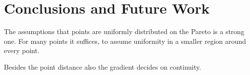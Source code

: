 \documentclass{stdlocal}
\begin{document}
\section{Conclusions and Future Work} %
\label{sec:conclusions}
  The assumptions that points are uniformly distributed on the Pareto is a strong one.
  For many points it suffices, to assume uniformity in a smaller region around every point.

  Besides the point distance also the gradient decides on continuity.
\end{document}
